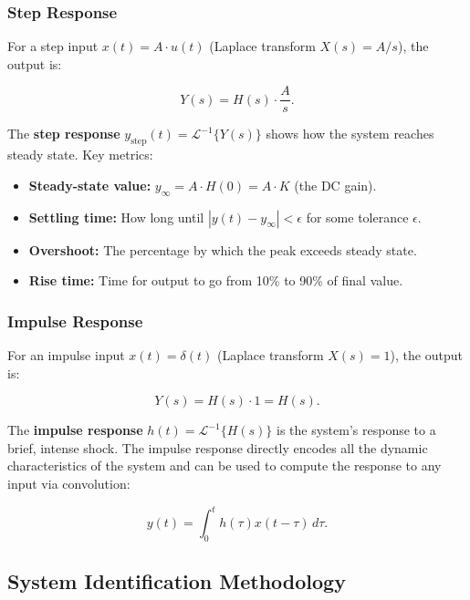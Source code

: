 \documentclass[11pt,letterpaper]{article}
\begin{document}
\subsubsection*{Step Response}

For a step input $x(t) = A \cdot u(t)$ (Laplace transform $X(s) = A/s$), the output is:

\begin{equation}
Y(s) = H(s) \cdot \frac{A}{s}.
\end{equation}

\noindent
The \textbf{step response} $y_{\text{step}}(t) = \mathcal{L}^{-1}\{Y(s)\}$ shows how the system reaches steady state. Key metrics:
\begin{itemize}
    \item \textbf{Steady-state value:} $y_{\infty} = A \cdot H(0) = A \cdot K$ (the DC gain).
    \item \textbf{Settling time:} How long until $|y(t) - y_{\infty}| < \epsilon$ for some tolerance $\epsilon$.
    \item \textbf{Overshoot:} The percentage by which the peak exceeds steady state.
    \item \textbf{Rise time:} Time for output to go from 10\% to 90\% of final value.
\end{itemize}

\subsubsection*{Impulse Response}

For an impulse input $x(t) = \delta(t)$ (Laplace transform $X(s) = 1$), the output is:

\begin{equation}
Y(s) = H(s) \cdot 1 = H(s).
\end{equation}

\noindent
The \textbf{impulse response} $h(t) = \mathcal{L}^{-1}\{H(s)\}$ is the system's response to a brief, intense shock. The impulse response directly encodes all the dynamic characteristics of the system and can be used to compute the response to any input via convolution:

\begin{equation}
y(t) = \int_0^t h(\tau) x(t - \tau) \, d\tau.
\end{equation}

\subsection{System Identification Methodology}
\end{document}
